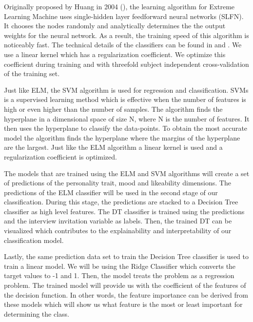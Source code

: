 Originally proposed by Huang in 2004 (\cite{huang2004extreme}), the learning algorithm for Extreme Learning Machine uses single-hidden layer feedforward neural networks (SLFN). It chooses the nodes randomly and analytically determines the the output weights for the neural network. As a result, the training speed of this algorithm is noticeably fast. The technical details of the classifiers can be found in \cite{huang2004extreme} and \cite{huang2006extreme}. We use a linear kernel which has a regularization coefficient. We optimize this coefficient during training and with threefold subject independent cross-validation of the training set. 

Just like ELM, the SVM algorithm is used for regression and classification. SVMs is a supervised learning method which is effective when the number of features is high or even higher than the number of samples. The algorithm finds the hyperplane in a dimensional space of size N, where N is the number of features. It then uses the hyperplane to classify the data-points. To obtain the most accurate model the algorithm finds the hyperplane where the margins of the hyperplane are the largest. Just like the ELM algorithm a linear kernel is used and a regularization coefficient is optimized. 

The models that are trained using the ELM and SVM algorithms will create a set of predictions of the personality trait, mood and likeability dimensions. The predictions of the ELM classifier will be used in the second stage of our classification. During this stage, the predictions are stacked to a Decision Tree classifier as high level features. The DT classifier is trained using the predictions and the interview invitation variable as labels. Then, the trained DT can be visualized which contributes to the explainability and interpretability of our classification model.

Lastly, the same prediction data set to train the Decision Tree classifier is used to train a linear model. We will be using the Ridge Classifier which converts the target values to -1 and 1. Then, the model treats the problem as a regression problem. The trained model will provide us with the coefficient of the features of the decision function. In other words, the feature importance can be derived from these models which will show us what feature is the most or least important for determining the class.
